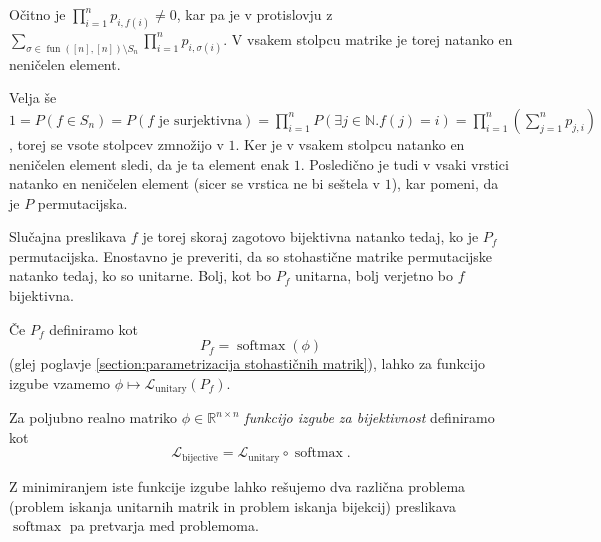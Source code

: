 \documentclass[mat2, tisk]{fmfdelo}
\newcommand{\R}{\mathbb R}
\newcommand{\N}{\mathbb N}
\newcommand{\fun}{\operatorname{fun}}
\newcommand{\funnn}[1]{\fun([#1], [#1])}
\newcommand{\Loss}[1]{\mathcal L _\text{#1}}
\begin{document}
\begin{dokaz}
  Očitno je $\prod_{i=1}^n p_{i, f(i)} \neq 0$, kar pa je
  v protislovju z $ \displaystyle \sum_{\sigma  \in
  \funnn{n} \setminus S_n} \prod_{i=1}^n p_{i,
  \sigma(i)}$.   V vsakem stolpcu matrike je torej
  natanko en neničelen element.

  Velja še $1 = P(f \in S_n) = P(f \text{ je
  surjektivna}) = \prod_{i=1}^n P(\exists j \in \N. f(j)= i) =
  \prod_{i=1}^n (\sum_{j=1}^n p_{j, i})$, torej se vsote
  stolpcev zmnožijo v $1$. Ker je v vsakem stolpcu
  natanko en neničelen element sledi, da je ta element
  enak $1$.  Posledično je tudi v vsaki vrstici natanko
  en neničelen element (sicer se vrstica ne bi seštela v
  $1$), kar pomeni, da je $P$ permutacijska.
\end{dokaz}
Slučajna preslikava $f$ je torej skoraj zagotovo
bijektivna natanko tedaj, ko je $P_f$ permutacijska.
Enostavno je preveriti, da so stohastične matrike
permutacijske natanko tedaj, ko so unitarne. Bolj, kot bo
$P_f$ unitarna, bolj verjetno bo $f$ bijektivna.

Če $P_f$ definiramo kot
$$P_f = \operatorname{softmax}(\phi)$$
(glej poglavje
\ref{section:parametrizacija stohastičnih matrik}), lahko
za funkcijo izgube vzamemo $\phi \mapsto \Loss{unitary}(P_f)$.

\begin{definicija}
  Za poljubno realno matriko $\phi \in \R^{n \times n}$
  \emph{funkcijo izgube za bijektivnost} definiramo kot
  $$
  \Loss{bijective} = \Loss{unitary} \circ \operatorname{softmax}.
  $$
\end{definicija}
Z minimiranjem iste funkcije izgube lahko rešujemo dva
različna problema (problem iskanja unitarnih matrik in
problem iskanja bijekcij) preslikava
$\operatorname{softmax}$  pa pretvarja med problemoma.
\end{document}

